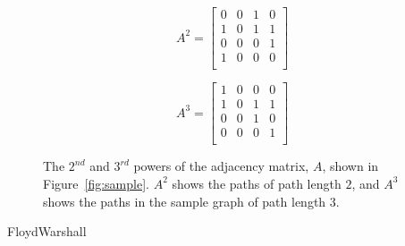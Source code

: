 \begin{figure}
\begin{minipage}{0.2\textwidth}
\begin{center}
\begin{displaymath}
A^2 = \left[ \begin{array}{cccc}
   0 & 0 & 1 & 0 \\
   1 & 0 & 1 & 1 \\
   0 & 0 & 0 & 1 \\
   1 & 0 & 0 & 0 \\
\end{array} \right]
\end{displaymath}
\end{center}
\end{minipage}
\hspace{10pt}
\begin{minipage}{0.2\textwidth}
\begin{center}
\begin{displaymath}
A^3 = \left[ \begin{array}{cccc}
   1 & 0 & 0 & 0 \\
   1 & 0 & 1 & 1 \\
   0 & 0 & 1 & 0 \\
   0 & 0 & 0 & 1 \\
\end{array} \right]
\end{displaymath}
\end{center}
\end{minipage}
\caption{The $2^{nd}$ and $3^{rd}$ powers of the adjacency matrix, $A$, shown
in Figure~\ref{fig:sample}. $A^2$ shows the paths of path length $2$, and $A^3$
shows the paths in the sample graph of path length $3$.}
\label{fig:sample_powers}
\end{figure}

\begin{algorithm}

\caption{FloydWarshall}
\label{alg:floyd_warshall}


\end{algorithm}

